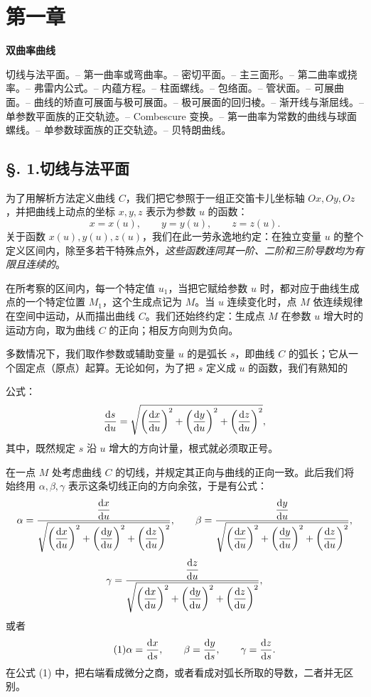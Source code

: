 \section*{第一章}
\begin{center}
{\Large\bfseries 双曲率曲线}
\end{center}

\begin{center}\footnotesize
切线与法平面。-- 第一曲率或弯曲率。-- 密切平面。-- 主三面形。-- 第二曲率或挠率。-- 弗雷内公式。-- 内蕴方程。-- 柱面螺线。-- 包络面。-- 管状面。-- 可展曲面。-- 曲线的矫直可展面与极可展面。-- 极可展面的回归棱。-- 渐开线与渐屈线。-- 单参数平面族的正交轨迹。-- Combescure 变换。-- 第一曲率为常数的曲线与球面螺线。-- 单参数球面族的正交轨迹。-- 贝特朗曲线。
\end{center}

\subsection*{§. 1.\quad 切线与法平面}
为了用解析方法定义曲线 \(C\)，我们把它参照于一组正交笛卡儿坐标轴 \(Ox, Oy, Oz\)，并把曲线上动点的坐标 \(x,y,z\) 表示为参数 \(u\) 的函数：
\[
  x=x(u), \qquad y=y(u), \qquad z=z(u).
\]
关于函数 \(x(u),y(u),z(u)\)，我们在此一劳永逸地约定：在独立变量 \(u\) 的整个定义区间内，除至多若干特殊点外，\emph{这些函数连同其一阶、二阶和三阶导数均为有限且连续的}。

在所考察的区间内，每一个特定值 \(u_1\)，当把它赋给参数 \(u\) 时，都对应于曲线生成点的一个特定位置 \(M_1\)，这个生成点记为 \(M\)。当 \(u\) 连续变化时，点 \(M\) 依连续规律在空间中运动，从而描出曲线 \(C\)。我们还始终约定：生成点 \(M\) 在参数 \(u\) 增大时的运动方向，取为曲线 \(C\) 的正向；相反方向则为负向。

多数情况下，我们取作参数或辅助变量 \(u\) 的是弧长 \(s\)，即曲线 \(C\) 的弧长；它从一个固定点（原点）起算。无论如何，为了把 \(s\) 定义成 \(u\) 的函数，我们有熟知的

\noindent 公式：
\[
\frac{\mathrm{d} s}{\mathrm{d} u}=\sqrt{\left(\frac{\mathrm{d} x}{\mathrm{d} u}\right)^2+\left(\frac{\mathrm{d} y}{\mathrm{d} u}\right)^2+\left(\frac{\mathrm{d} z}{\mathrm{d} u}\right)^2},
\]
其中，既然规定 \(s\) 沿 \(u\) 增大的方向计量，根式就必须取正号。

在一点 \(M\) 处考虑曲线 \(C\) 的切线，并规定其正向与曲线的正向一致。此后我们将始终用 \(\alpha,\beta,\gamma\) 表示这条切线正向的方向余弦，于是有公式：
\[
\alpha=\frac{\dfrac{\mathrm{d} x}{\mathrm{d} u}}{\sqrt{\left(\dfrac{\mathrm{d} x}{\mathrm{d} u}\right)^2+\left(\dfrac{\mathrm{d} y}{\mathrm{d} u}\right)^2+\left(\dfrac{\mathrm{d} z}{\mathrm{d} u}\right)^2}},\qquad
\beta=\frac{\dfrac{\mathrm{d} y}{\mathrm{d} u}}{\sqrt{\left(\dfrac{\mathrm{d} x}{\mathrm{d} u}\right)^2+\left(\dfrac{\mathrm{d} y}{\mathrm{d} u}\right)^2+\left(\dfrac{\mathrm{d} z}{\mathrm{d} u}\right)^2}},
\]
\[
\gamma=\frac{\dfrac{\mathrm{d} z}{\mathrm{d} u}}{\sqrt{\left(\dfrac{\mathrm{d} x}{\mathrm{d} u}\right)^2+\left(\dfrac{\mathrm{d} y}{\mathrm{d} u}\right)^2+\left(\dfrac{\mathrm{d} z}{\mathrm{d} u}\right)^2}},
\]
或者
\begin{equation}\tag{1}
\alpha=\frac{\mathrm{d} x}{\mathrm{d} s},\qquad \beta=\frac{\mathrm{d} y}{\mathrm{d} s},\qquad \gamma=\frac{\mathrm{d} z}{\mathrm{d} s}.
\end{equation}
在公式 (1) 中，把右端看成微分之商，或者看成对弧长所取的导数，二者并无区别。

